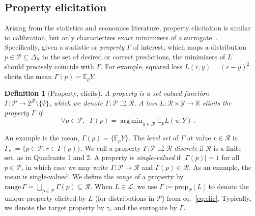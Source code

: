 \documentclass[11pt]{article} %
\newcommand{\Comments}{1}
\newcommand{\mytodo}[2]{\ifnum\Comments=1%
	\todo[linecolor=#1!80!black,backgroundcolor=#1,bordercolor=#1!80!black]{#2}\fi}
\newcommand{\raft}[1]{\mytodo{green!20!white}{RF: #1}}
\newcommand{\jessiet}[1]{\mytodo{purple!20!white}{JF: #1}}
\newcommand{\reals}{\mathbb{R}}
\newcommand{\simplex}{\Delta_\Y}
\newcommand{\prop}[2][\mathcal{P}]{\mathrm{prop}_{#1}[#2]}
\newcommand{\range}{\mathrm{range}\,}
\newcommand{\E}{\mathbb{E}}
\renewcommand{\L}{\mathcal{L}}
\newcommand{\R}{\mathcal{R}}
\renewcommand{\P}{\mathcal{P}}
\newcommand{\Y}{\mathcal{Y}}
\newcommand{\exploss}[3]{\E_{#3} #1(#2,Y)}
\newcommand{\toto}{\rightrightarrows}
\newtheorem{definition}{Definition}
\DeclareMathOperator*{\argmin}{arg\,min}
\begin{document}
\subsection{Property elicitation}\label{subsec:properties}
Arising from the statistics and economics literature, property elicitation is similar to calibration, but only characterizes exact minimizers of a surrogate~\citep{savage1971elicitation,osband1985information-eliciting,lambert2008eliciting,lambert2009eliciting,lambert2018elicitation,frongillo2015vector-valued,frongillo2014general}.
Specifically, given a statistic or \emph{property} $\Gamma$ of interest, which maps a distribution $p \in \P \subseteq \simplex$ to the set of desired or correct predictions, the minimizers of $L$ should precisely coincide with $\Gamma$.
For example, squared loss $L(r,y) = (r-y)^2$ elicits the mean $\Gamma(p) = \E_p Y$.

\begin{definition}[Property, elicits]
	A \emph{property} is a set-valued function $\Gamma : \P \to 2^\R \setminus \{\emptyset\}$, which we denote $\Gamma: \P \toto \R$.
	A loss $L : \R \times \Y \to \reals$ \emph{elicits} the property $\Gamma$ if
	\begin{equation}
    \label{eq:elic}    
    \forall p \in \P, \;\; \Gamma(p) = \argmin_{u \in \R} \exploss{L}{u}{p}~.
	\end{equation}
\end{definition}
An example is the mean, $\Gamma(p) = \{\E_p Y\}$.
The \emph{level set} of $\Gamma$ at value $r\in\R$ is $\Gamma_r := \{p \in \P : r \in \Gamma(p)\}$.
We call a property $\Gamma: \P \toto \R$ \emph{discrete} if $\R$ is a finite set, as in Quadrants 1 and 2.
A property is \emph{single-valued} if $|\Gamma(p)|=1$ for all $p\in\P$, in which case we may write $\Gamma:\P\to\R$ and $\Gamma(p) \in \R$.
As an example, the mean is single-valued.
We define the \emph{range} of a property by $\range \Gamma = \bigcup_{p\in\P} \Gamma(p) \subseteq \R$.
When $L\in\L$, we use $\Gamma := \prop[\P]{L}$ to denote the unique property elicited by $L$ (for distributions in $\P$) from eq.~\eqref{eq:elic}. 
Typically, we denote the target property by $\gamma$, and the surrogate by $\Gamma$.
\end{document}
